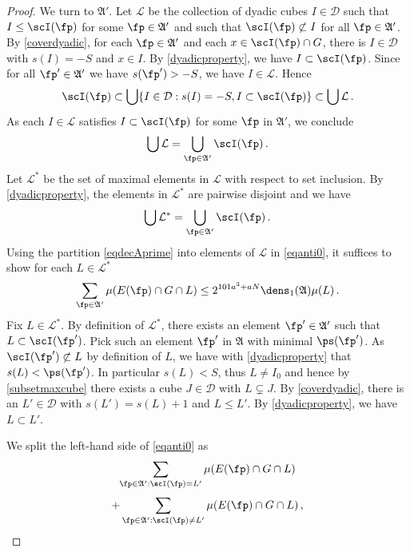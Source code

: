 \begin{proof}
We turn to $\mathfrak{A}'$.
Let $\mathcal{L}$ be the collection of dyadic cubes $I\in\mathcal{D}$ such that $I \le \scI(\fp)$
for some $\fp\in\mathfrak{A}'$ and such that $\scI(\fp)\not \subset I$ for all $\fp\in\mathfrak{A}'$.
By \eqref{coverdyadic}, for each $\fp \in \mathfrak{A}'$
and each $x\in \scI(\fp)\cap G$, there is $I\in \mathcal{D}$ with $s(I)=-S$ and $x\in I$.
By \eqref{dyadicproperty}, we have $I\subset \scI(\fp)$. Since for all $\fp' \in \mathfrak{A}'$ we
have $s(\fp') > -S$, we have $I \in \mathcal{L}$. Hence
\begin{equation}
    \scI(\fp)\subset \bigcup\{I\in \mathcal{D}: s(I)=-S, I\subset \scI(\fp)\}\subset \bigcup \mathcal{L}\, .
\end{equation}
As each $I\in \mathcal{L}$ satisfies $I\subset \scI(\fp)$ for some $\fp$ in $\mathfrak{A'}$, we conclude
\begin{equation}
    \bigcup\mathcal{L}=\bigcup_{\fp \in \mathfrak{A}'}\scI(\fp)\, .
\end{equation}
Let $\mathcal{L}^*$ be the set of maximal elements in $\mathcal{L}$ with respect to set inclusion.
By \eqref{dyadicproperty}, the elements in $\mathcal{L}^*$ are pairwise disjoint and we have
 \begin{equation}\label{eqdecAprime}
\bigcup\mathcal{L}^*=\bigcup_{\fp \in \mathfrak{A}'}\scI(\fp)\, .
   \end{equation}
Using the partition \eqref{eqdecAprime} into elements of $\mathcal{L}$ in \eqref{eqanti0}, it suffices to show for each $L\in \mathcal{L}^*$
\begin{equation}\label{eqanti0}
    \sum_{\fp\in\mathfrak{A}'}\mu(E(\fp)\cap G \cap L)
    \le
    2^{101a^3+aN}
    \dens_1(\mathfrak{A})\mu(L)\,.
\end{equation}
Fix $L\in \mathcal{L}^*$. By definition of $\mathcal{L}^*$, there exists an element $\fp'\in \mathfrak{A}'$
such that $L\subset \scI(\fp')$. Pick such an element $\fp'$ in $\mathfrak{A}$ with
minimal $\ps(\fp')$. As $\scI(\fp')\not \subset L$ by definition of $L$,
we have with \eqref{dyadicproperty} that $s(L)< \ps(\fp')$.
In particular $s(L)<S$, thus $L \ne I_0$ and hence by \eqref{subsetmaxcube}
there exists a cube $J \in \mathcal{D}$ with $L \subsetneq J$.
By \eqref{coverdyadic}, there is an $L'\in \mathcal{D}$ with $s(L')=s(L)+1$ and $L \le L'$.
By \eqref{dyadicproperty}, we have $L\subset L'$.

We split the left-hand side of \eqref{eqanti0} as
\begin{equation}\label{eqanti1}
    \sum_{\fp\in\mathfrak{A}':\scI(\fp)=L'}\mu(E(\fp)\cap G\cap L)
\end{equation}
\begin{equation}\label{eqanti2}
    +
     \sum_{\fp\in\mathfrak{A}':\scI(\fp)\neq L'}\mu(E(\fp)\cap G\cap L)\, ,
\end{equation}


\end{proof}
